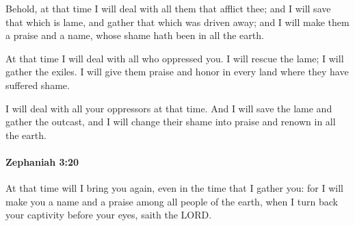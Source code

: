 			\begin{versebox}
					\item[BHS] 
					\item[LXX] 
					\item[ASV] Behold, at that time I will deal with all them that afflict thee; and I will save that which is lame, and gather that which was driven away; and I will make them a praise and a name, whose shame hath been in all the earth.
					\item[NIV] At that time I will deal with all who oppressed you. I will rescue the lame; I will gather the exiles. I will give them praise and honor in every land where they have suffered shame.
					\item[NRSV] I will deal with all your oppressors at that time. And I will save the lame and gather the outcast, and I will change their shame into praise and renown in all the earth.
			\end{versebox}

		\paragraph{Zephaniah 3:20} %
			\label{ZEPHANIAH-3-20}

			At that time will I bring you again, even in the time that I gather you: for I will make you a name and a praise among all people of the earth, when I turn back your captivity before your eyes, saith the LORD.

